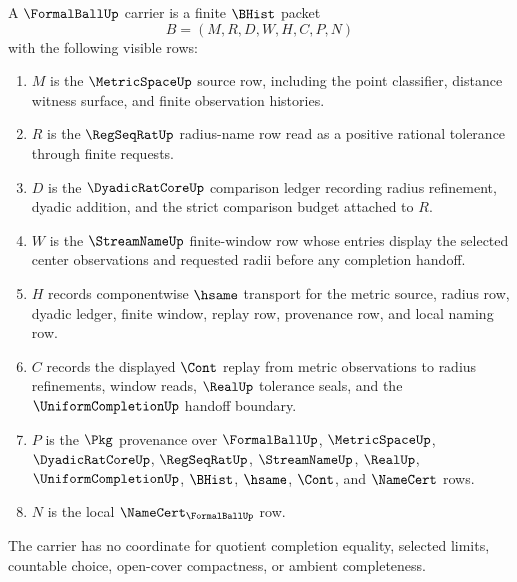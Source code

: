 \begin{definition}
\label{def:formalball-carrier}
A $\FormalBallUp$ carrier is a finite $\BHist$ packet
$$
B=(M,R,D,W,H,C,P,N)
$$
with the following visible rows:
\begin{enumerate}
\item $M$ is the $\MetricSpaceUp$ source row, including the point classifier, distance witness surface, and finite observation histories.
\item $R$ is the $\RegSeqRatUp$ radius-name row read as a positive rational tolerance through finite requests.
\item $D$ is the $\DyadicRatCoreUp$ comparison ledger recording radius refinement, dyadic addition, and the strict comparison budget attached to $R$.
\item $W$ is the $\StreamNameUp$ finite-window row whose entries display the selected center observations and requested radii before any completion handoff.
\item $H$ records componentwise $\hsame$ transport for the metric source, radius row, dyadic ledger, finite window, replay row, provenance row, and local naming row.
\item $C$ records the displayed $\Cont$ replay from metric observations to radius refinements, window reads, $\RealUp$ tolerance seals, and the $\UniformCompletionUp$ handoff boundary.
\item $P$ is the $\Pkg$ provenance over $\FormalBallUp$, $\MetricSpaceUp$, $\DyadicRatCoreUp$, $\RegSeqRatUp$, $\StreamNameUp$, $\RealUp$, $\UniformCompletionUp$, $\BHist$, $\hsame$, $\Cont$, and $\NameCert$ rows.
\item $N$ is the local $\NameCert_{\FormalBallUp}$ row.
\end{enumerate}
The carrier has no coordinate for quotient completion equality, selected limits, countable choice, open-cover compactness, or ambient completeness.
\end{definition}

